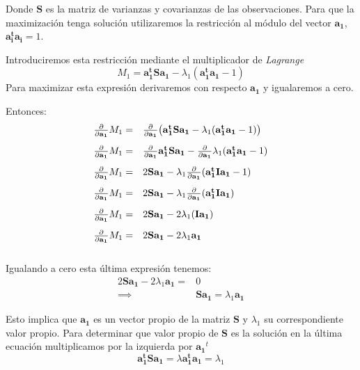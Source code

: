 \documentclass[12pt,letterpaper]{report} %
\begin{document}
Donde $\mathbf{S}$ es la matriz de varianzas y covarianzas de las observaciones. Para que la maximización tenga solución utilizaremos la restricción al módulo del vector $\mathbf{a_1}$,  $\mathbf{a_i^ta_i}=1$.

Introduciremos esta restricción mediante el multiplicador de \textit{Lagrange}
$$M_1=\mathbf{a_1^t} \mathbf{Sa_1}-\lambda_1(\mathbf{a_1^ta_1}-1)$$
Para maximizar esta expresión derivaremos con respecto $\mathbf{a_1}$ y igualaremos a cero. 

Entonces:
$$
\begin{array}{rl}
\vspace{3mm} \frac{\partial}{\partial \mathbf{a_1}}M_1  = &\frac{\partial}{\partial \mathbf{a_1}}\big(\mathbf{a_1^t} \mathbf{Sa_1}-\lambda_1(\mathbf{a_1^ta_1}-1)\big)\\ \vspace{3mm}
\frac{\partial}{\partial \mathbf{a_1}}M_1 = & \frac{\partial}{\partial \mathbf{a_1}}\mathbf{a_1^t} \mathbf{Sa_1}-\frac{\partial}{\partial \mathbf{a_1}}\lambda_1(\mathbf{a_1^ta_1}-1)\\ \vspace{3mm}
\frac{\partial}{\partial \mathbf{a_1}}M_1 = & 2\mathbf{Sa_1}-\lambda_1\frac{\partial}{\partial \mathbf{a_1}}(\mathbf{a_1^tIa_1}-1)\\ \vspace{3mm}
\frac{\partial}{\partial \mathbf{a_1}}M_1 = & 2\mathbf{Sa_1}-\lambda_1\frac{\partial}{\partial \mathbf{a_1}}(\mathbf{a_1^tIa_1})\\ \vspace{3mm}
\frac{\partial}{\partial \mathbf{a_1}}M_1 = & 2\mathbf{Sa_1}-2\lambda_1(\mathbf{Ia_1})\\ \vspace{3mm}
\frac{\partial}{\partial \mathbf{a_1}}M_1 = & 2\mathbf{Sa_1}-2\lambda_1 \mathbf{a_1}\\ 
\end{array}
$$

Igualando a cero esta última expresión tenemos:
$$
\begin{array}{rl}
2\mathbf{Sa_1}-2\lambda_1 \mathbf{a_1}= & 0\\
\implies & \mathbf{Sa_1}=\lambda_1 \mathbf{a_1}
\end{array}
$$

Esto implica que $\mathbf{a_1}$ es un vector propio de la matriz $\mathbf{S}$ y $\lambda_1$ su correspondiente valor propio. Para determinar que valor propio de $\mathbf{S}$ es la solución en la última ecuación multiplicamos por la izquierda por $\mathbf{a_1}^t$
$$\mathbf{a_1^t S a_1}=\lambda \mathbf{a_1^ta_1}=\lambda_1$$
\end{document}
